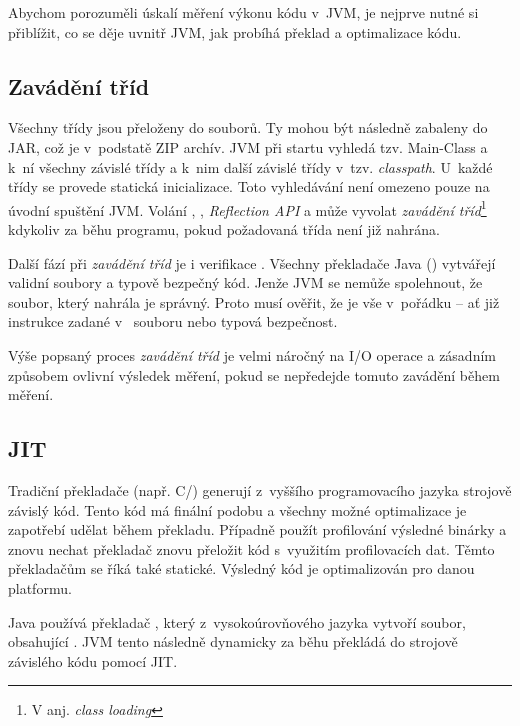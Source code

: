 Abychom porozuměli úskalí měření výkonu kódu v~JVM, je nejprve nutné si přiblížit, co se děje uvnitř JVM, jak probíhá překlad a optimalizace kódu.

\subsection{Zavádění tříd}

Všechny třídy jsou přeloženy do \classfile{} souborů. Ty mohou být následně zabaleny do JAR, což je v~podstatě ZIP archív. JVM při startu vyhledá tzv. Main-Class a k~ní všechny závislé třídy a k~nim další závislé třídy v~tzv. \emph{classpath}. U~každé třídy se provede statická inicializace. Toto vyhledávání není omezeno pouze na úvodní spuštění JVM. Volání , , \emph{Reflection API} a  může vyvolat \emph{zavádění tříd}\footnote{V anj. \emph{class loading}} kdykoliv za běhu programu, pokud požadovaná třída není již nahrána\cite{gosling2013java}\cite{lindholm2013java}.

Další fází při \emph{zavádění tříd} je i verifikace \bytecode{}. Všechny překladače Java (\javac{}) vytvářejí validní \classfile{} soubory a typově bezpečný kód. Jenže JVM se nemůže spolehnout, že soubor, který nahrála je správný. Proto musí ověřit, že je vše v~pořádku -- ať již instrukce zadané v~\classfile{} souboru nebo typová bezpečnost.

Výše popsaný proces \emph{zavádění tříd} je velmi náročný na I/O operace a zásadním způsobem ovlivní výsledek měření, pokud se nepředejde tomuto zavádění během měření.

\subsection{JIT\label{sub:JIT}}
Tradiční překladače (např. C/\CC) generují z~vyššího programovacího jazyka strojově závislý kód. Tento kód má finální podobu a všechny možné optimalizace je zapotřebí udělat během překladu. Případně použít profilování výsledné binárky a znovu nechat překladač znovu přeložit kód s~využitím profilovacích dat. Těmto překladačům se říká také statické. Výsledný kód je optimalizován pro danou platformu.

Java používá překladač \javac{}, který z~vysokoúrovňového jazyka vytvoří \classfile{} soubor, obsahující \bytecode{}. JVM tento \bytecode{} následně dynamicky za běhu překládá do strojově závislého kódu pomocí JIT.

